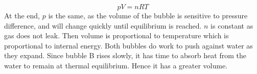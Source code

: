 \documentclass[answers]{exam}
\begin{document}
\begin{questions}
\begin{solution}
	$$pV = nRT$$
	At the end, $p$ is the same, as the volume of the bubble is sensitive to pressure difference, and will change quickly until equilibrium is reached. $n$ is constant as gas does not leak. Then volume is proportional to temperature which is proportional to internal energy. Both bubbles do work to push against water as they expand. Since bubble B rises slowly, it has time to absorb heat from the water to remain at thermal equilibrium. Hence it has a greater volume.
\end{solution}

\end{questions}
\end{document}
